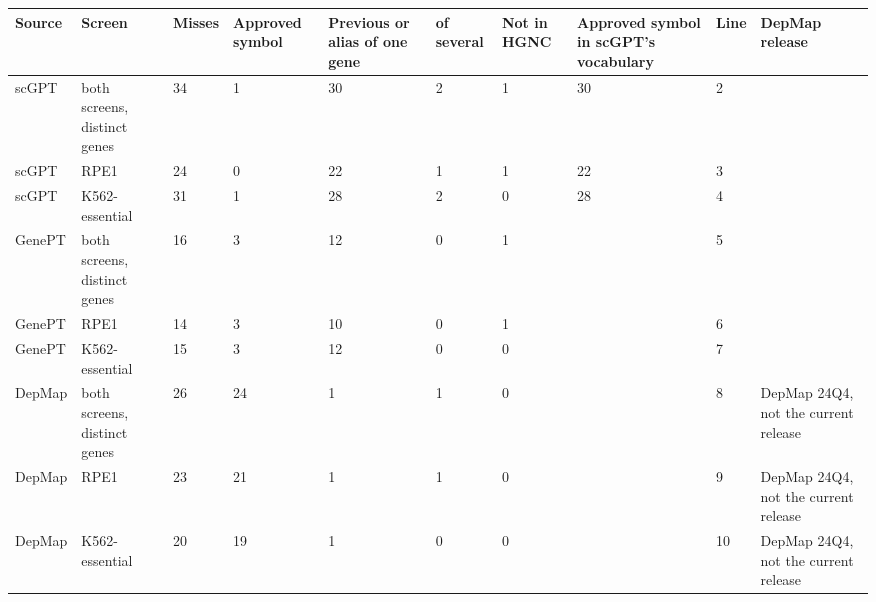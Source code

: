 \begin{tabular}{llllllllll}
\toprule
Source & Screen & Misses & Approved symbol & Previous or alias of one gene & of several & Not in HGNC & Approved symbol in scGPT's vocabulary & Line & DepMap release \\
\midrule
scGPT & both screens, distinct genes & 34 & 1 & 30 & 2 & 1 & 30 & 2 &  \\
scGPT & RPE1 & 24 & 0 & 22 & 1 & 1 & 22 & 3 &  \\
scGPT & K562-essential & 31 & 1 & 28 & 2 & 0 & 28 & 4 &  \\
GenePT & both screens, distinct genes & 16 & 3 & 12 & 0 & 1 &  & 5 &  \\
GenePT & RPE1 & 14 & 3 & 10 & 0 & 1 &  & 6 &  \\
GenePT & K562-essential & 15 & 3 & 12 & 0 & 0 &  & 7 &  \\
DepMap & both screens, distinct genes & 26 & 24 & 1 & 1 & 0 &  & 8 & DepMap 24Q4, not the current release \\
DepMap & RPE1 & 23 & 21 & 1 & 1 & 0 &  & 9 & DepMap 24Q4, not the current release \\
DepMap & K562-essential & 20 & 19 & 1 & 0 & 0 &  & 10 & DepMap 24Q4, not the current release \\
\bottomrule
\end{tabular}
